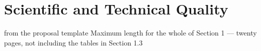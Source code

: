 \chapter{Scientific and Technical Quality}\label{chap:quality}
\begin{todo}{from the proposal template}
  Maximum length for the whole of Section 1 –-- twenty pages, not including the tables in
  Section 1.3
\end{todo}





